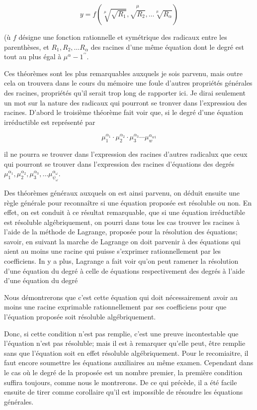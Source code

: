 \documentclass{article}
\begin{document}
\[
y=f\left(\sqrt[\mu]{\sqrt{R_{1}}}, \stackrel{\mu}{\sqrt{R_{2}}}, \ldots \sqrt[\mu]{R_{\alpha}}\right)
\]

(ù \(f\) désigne une fonction rationnelle et symétrique des radicaux entre les parenthèses, et \(R_{1}, R_{2}, \ldots R_{\alpha}\) des racines d'une même équation dont le degré est tout au plus égal à \(\mu^{\alpha}-1^{\prime \prime}\).

Ces théorèmes sont les plus remarquables auxquels je sois parvenu, mais outre cela on trouvera dans le cours du mémoire une foule d'autres propriétés générales des racines, propriétés qu'il serait trop long de rapporter ici. Je dirai seulement un mot sur la nature des radicaux qui pourront se tronver dans l'expressiou des racines. D'abord le troisième théorème fait voir que, si le degré d'une équation irréductible est représenté par

\[
\mu_{1}^{\alpha_{1}} \cdot \mu_{2}^{\alpha_{2}} \cdot \mu_{3}^{\alpha_{3}} \cdots \mu_{w}^{\alpha_{w 1}}
\]

il ne pourra se trouver dans l'expression des racines d'autres radicalux que ceux qui pourront se trouver dans l'expression des racines d'équations des degrés \(\mu_{1}^{\alpha_{1}}, \mu_{2}^{\alpha_{2}}, \mu_{3}^{\alpha_{3}}, \ldots \mu_{\psi_{\omega}}^{\alpha_{\omega}}\).

Des théorèmes généraux auxquels on est ainsi parvenu, on déduit ensuite une règle générale pour reconnaître si une équation proposée est résoluble ou non. En effet, on est conduit à ce résultat remarquable, que si une équation irréductible est résoluble algébriquement, on pourri dans tous les cas trouver les racines à l'aide de la méthode de Lagrange, proposée pour la résolution des équations; savoir, en suivant la marche de Lagrange on doit parvenir à des équations qui aient au moins une racine qui puisse s'exprimer rationnellement par les coefficiens. In y a plus, Lagrange a fait voir qu'on peut ramener la résolution d'une équation du degré à celle de équations respectivement des degrés à l'aide d'une équation du degré

Nous démontrerons que c'est cette équation qui doit nécessairement avoir au moins une racine exprimable rationnellement par ses coefficiens pour que l'équation proposée soit résoluble algébriquement.

Donc, si cette condition n'est pas remplie, c'est une preuve incontestable que l'équation n'est pas résoluble; mais il est à remarquer qu'elle peut, être remplie sans que l'équation soit en effet résoluble algébriquement. Pour le recomiaitre, il faut encore soumettre les équations auxiliaires au même examen. Cependant dans le cas où le degré de la proposée est un nombre premier, la première condition suffira toujours, comme nous le montrerons. De ce qui
précède, il a été facile ensuite de tirer comme corollaire qu'il est impossible de résoudre les équations générales.
\end{document}
